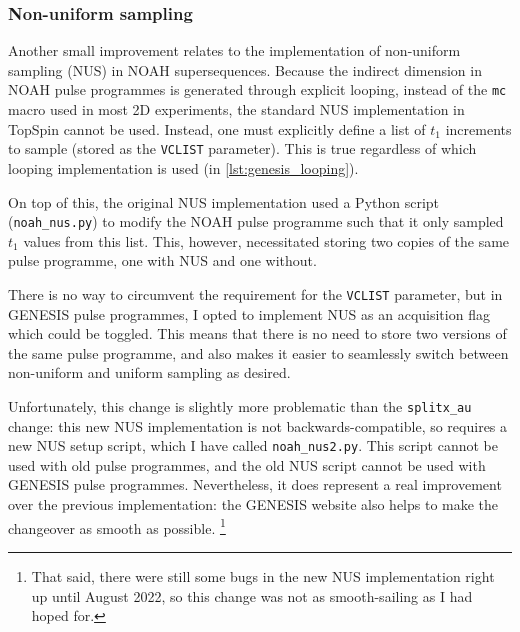 \subsubsection{Non-uniform sampling}

Another small improvement relates to the implementation of non-uniform sampling (NUS) in NOAH supersequences.
Because the indirect dimension in NOAH pulse programmes is generated through explicit looping, instead of the \texttt{mc} macro used in most 2D experiments, the standard NUS implementation in TopSpin cannot be used.
Instead, one must explicitly define a list of $t_1$ increments to sample (stored as the \texttt{VCLIST} parameter).
This is true regardless of which looping implementation is used (in \cref{lst:genesis_looping}).

On top of this, the original NUS implementation\autocite{Claridge2019MRC} used a Python script (\texttt{noah\_nus.py}) to modify the NOAH pulse programme such that it only sampled $t_1$ values from this list.
This, however, necessitated storing two copies of the same pulse programme, one with NUS and one without.

There is no way to circumvent the requirement for the \texttt{VCLIST} parameter, but in GENESIS pulse programmes, I opted to implement NUS as an acquisition flag which could be toggled.
This means that there is no need to store two versions of the same pulse programme, and also makes it easier to seamlessly switch between non-uniform and uniform sampling as desired.

Unfortunately, this change is slightly more problematic than the \texttt{splitx\_au} change: this new NUS implementation is not backwards-compatible, so requires a new NUS setup script, which I have called \texttt{noah\_nus2.py}.
This script cannot be used with old pulse programmes, and the old NUS script cannot be used with GENESIS pulse programmes.
Nevertheless, it does represent a real improvement over the previous implementation: the GENESIS website also helps to make the changeover as smooth as possible.%
\footnote{That said, there were still some bugs in the new NUS implementation right up until August 2022, so this change was not as smooth-sailing as I had hoped for.}
